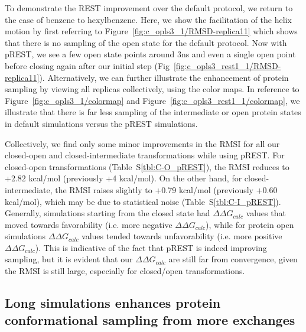 To demonstrate the REST improvement over the default protocol, we return to the case of benzene to hexylbenzene.
Here, we show the facilitation of the helix motion by first referring to Figure~\ref{fig:c_opls3_1/RMSD-replica11} which shows that there is no sampling of the open state for the default protocol.
Now with pREST, we see a few open state points around 3ns and even a single open point before closing again after our initial step (Fig~\ref{fig:c_opls3_rest1_1/RMSD-replica11}).
Alternatively, we can further illustrate the enhancement of protein sampling by viewing all replicas collectively, using the color maps.
In reference to Figure~\ref{fig:c_opls3_1/colormap} and Figure~\ref{fig:c_opls3_rest1_1/colormap}, we illustrate that there is far less sampling of the intermediate or open protein states in default simulations versus the pREST simulations.

Collectively, we find only some minor improvements in the RMSI for all our closed-open and closed-intermediate transformations while using pREST.
For closed-open transformations (Table~S\ref{tbl:C-O_pREST}), the RMSI reduces to +2.82 kcal/mol (previously +4 kcal/mol).
On the other hand, for closed-intermediate, the RMSI raises slightly to +0.79 kcal/mol (previously +0.60 kcal/mol), which may be due to statistical noise (Table~S\ref{tbl:C-I_pREST}).
Generally, simulations starting from the closed state had $\Delta\Delta G_{calc}$ values that moved towards favorability (i.e. more negative $\Delta\Delta G_{calc}$), while for protein open simulations $\Delta\Delta G_{calc}$ values tended towards unfavorability (i.e. more positive $\Delta\Delta G_{calc}$).
This is indicative of the fact that pREST is indeed improving sampling, but it is evident that our $\Delta\Delta G_{calc}$ are still far from convergence, given the RMSI is still large, especially for closed/open transformations.

\subsection{Long simulations enhances protein conformational sampling from more exchanges}

